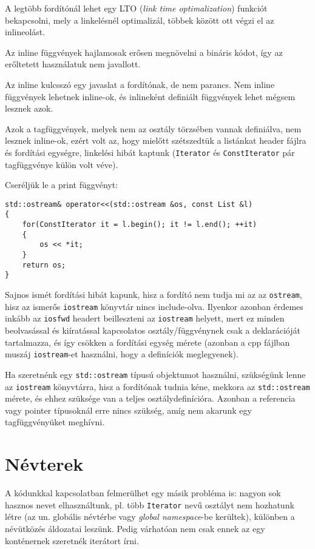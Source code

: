 \documentclass[a4paper,11.5pt,table]{article}
\begin{document}
	\begin{note}
		A legtöbb fordítónál lehet egy LTO (\textit{link time optimalization}) funkciót bekapcsolni, mely a linkelésnél optimalizál, többek között ott végzi el az inlineolást.
	\end{note}
	\begin{note}
		Az inline függvények hajlamosak erősen megnövelni a bináris kódot, így az erőltetett használatuk nem javallott.
	\end{note}
	\begin{note}
		Az inline kulcsszó egy javaslat a fordítónak, de nem parancs. Nem inline függvények lehetnek inline-ok, és inlineként definiált függvények lehet mégsem lesznek azok.
	\end{note}
	Azok a tagfüggvények, melyek nem az osztály törzsében vannak definiálva, nem lesznek inline-ok, ezért volt az, hogy mielőtt szétszedtük a listánkat header fájlra és fordítási egységre, linkelési hibát kaptunk (\texttt{Iterator} és \texttt{ConstIterator} pár tagfüggvénye külön volt véve).
	\medskip
	
	Cseréljük le a print függvényt:
	\begin{lstlisting}
std::ostream& operator<<(std::ostream &os, const List &l)
{
	for(ConstIterator it = l.begin(); it != l.end(); ++it)
	{
		os << *it;
	}
	return os;
}
	\end{lstlisting}
	Sajnos ismét fordítási hibát kapunk, hisz a fordító nem tudja mi az az \texttt{ostream}, hisz az ismerős \texttt{iostream} könyvtár nincs include-olva. Ilyenkor azonban érdemes inkább az \texttt{iosfwd} headert beilleszteni az \texttt{iostream} helyett, mert ez minden beolvasással és kiíratással kapcsolatos osztály/függvénynek csak a deklarációját tartalmazza, és így csökken a fordítási egység mérete (azonban a cpp fájlban muszáj \texttt{iostream}-et használni, hogy a definíciók meglegyenek).
	\begin{note}
		Ha szeretnénk egy \texttt{std::ostream} típusú objektumot használni, szükségünk lenne az \texttt{iostream} könyvtárra, hisz a fordítónak tudnia kéne, mekkora az \texttt{std::ostream} mérete, és ehhez szüksége van a teljes osztálydefinícióra. Azonban a referencia vagy pointer típusoknál erre nincs szükség, amíg nem akarunk egy tagfüggvényüket meghívni.
	\end{note}
	\section{Névterek}
	A kódunkkal kapcsolatban felmerülhet egy másik probléma is: nagyon sok hasznos nevet elhasználtunk, pl. több \texttt{Iterator} nevű osztályt nem hozhatunk létre (az un. globális névtérbe vagy \textit{global namespace}-be kerültek), különben a névütközés áldozatai leszünk. Pedig várhatóan nem csak ennek az egy konténernek szeretnék iterátort írni.
	\smallskip
	
\end{document}
